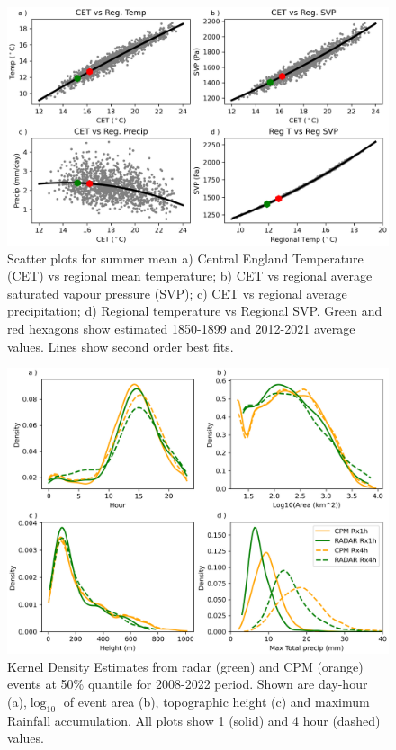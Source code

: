 \documentclass[11pt,a4paper]{article}
\begin{document}
\begin{figure}[tp]
	\centering
	\includegraphics[width=\linewidth]{scatter.png}
	\caption{Scatter plots for summer mean  a)  Central England Temperature (CET) vs  regional mean temperature; b) CET vs regional average saturated vapour pressure (SVP); c) CET vs regional average precipitation; d) Regional temperature vs Regional SVP. Green and red hexagons show estimated 1850-1899 and 2012-2021 average values. Lines show second order best fits.}
	\label{fig:cet_scatter}
\end{figure}





\begin{figure}
	\centering
	\includegraphics[width=\linewidth]{CPM_radar_comp}
	\caption{Kernel Density Estimates from radar (green) and CPM (orange) events at 50\% quantile for 2008-2022 period. Shown are day-hour (a),$\log_{10}$ of event area (b),  topographic height (c) and maximum Rainfall accumulation. All plots show 1 (solid) and 4 hour (dashed) values.  }
\end{figure}
\end{document}
